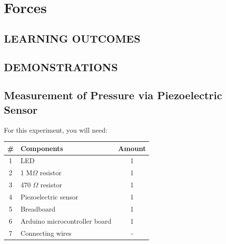 \chapter{Forces}

\section*{LEARNING OUTCOMES}
{
\begin{center}
\end{center}
}

\section*{DEMONSTRATIONS}
\section*{Measurement of Pressure via Piezoelectric Sensor}
For this experiment, you will need:

\begin{table}[H]
    \centering
    \begin{tabular}{|c|l|c|}\hline
     \textbf{\#} & \textbf{Components}  &  \textbf{Amount}\\\hline
     1 & LED                            &  1\\\hline
     2 & 1 M$\Omega$ resistor           & 1\\\hline
     3 & 470 $\Omega$ resistor           & 1\\\hline
     4 & Piezoelectric sensor                   &  1\\\hline
     5 & Breadboard                     & 1\\\hline
     6 & Arduino microcontroller board  &  1\\\hline
     7 & Connecting wires               & - \\\hline
    \end{tabular}
\end{table}

